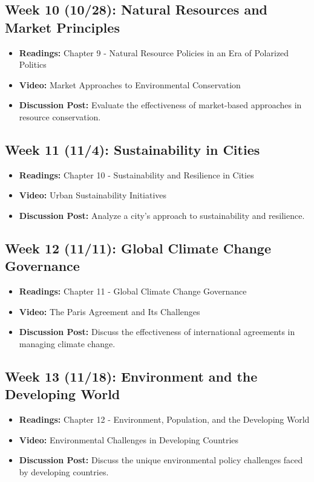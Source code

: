 \documentclass[12pt, letterpaper]{article}
\begin{document}
\subsection*{Week 10 (10/28): Natural Resources and Market Principles}
\begin{itemize}
    \item \textbf{Readings:} Chapter 9 - Natural Resource Policies in an Era of Polarized Politics
    \item \textbf{Video:} Market Approaches to Environmental Conservation
    \item \textbf{Discussion Post:} Evaluate the effectiveness of market-based approaches in resource conservation.
\end{itemize}

\subsection*{Week 11 (11/4): Sustainability in Cities}
\begin{itemize}
    \item \textbf{Readings:} Chapter 10 - Sustainability and Resilience in Cities
    \item \textbf{Video:} Urban Sustainability Initiatives
    \item \textbf{Discussion Post:} Analyze a city’s approach to sustainability and resilience.
\end{itemize}

\subsection*{Week 12 (11/11): Global Climate Change Governance}
\begin{itemize}
    \item \textbf{Readings:} Chapter 11 - Global Climate Change Governance
    \item \textbf{Video:} The Paris Agreement and Its Challenges
    \item \textbf{Discussion Post:} Discuss the effectiveness of international agreements in managing climate change.
\end{itemize}

\subsection*{Week 13 (11/18): Environment and the Developing World}
\begin{itemize}
    \item \textbf{Readings:} Chapter 12 - Environment, Population, and the Developing World
    \item \textbf{Video:} Environmental Challenges in Developing Countries
    \item \textbf{Discussion Post:} Discuss the unique environmental policy challenges faced by developing countries.
\end{itemize}
\end{document}
